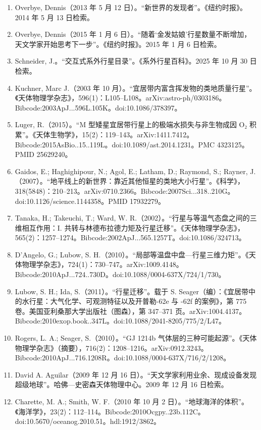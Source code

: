 \begin{enumerate}
\item Overbye, Dennis（2013 年 5 月 12 日）。“新世界的发现者”。《纽约时报》。2014 年 5 月 13 日检索。
\item Overbye, Dennis（2015 年 1 月 6 日）。“随着‘金发姑娘’行星数量不断增加，天文学家开始思考下一步”。《纽约时报》。2015 年 1 月 6 日检索。
\item Schneider, J.。“交互式系外行星目录”。《系外行星百科》。2025 年 10 月 30 日检索。
\item Kuchner, Marc J.（2003 年 10 月）。“宜居带内富含挥发物的类地质量行星”。《天体物理学杂志》，596(1)：L105–L108。arXiv:astro-ph/0303186。Bibcode:2003ApJ...596L.105K。doi:10.1086/378397。
\item Luger, R.（2015）。“M 型矮星宜居带行星上的极端水损失与非生物成因 O₂ 积累”。《天体生物学》，15(2)：119–143。arXiv:1411.7412。Bibcode:2015AsBio..15..119L。doi:10.1089/ast.2014.1231。PMC 4323125。PMID 25629240。
\item Gaidos, E.; Haghighipour, N.; Agol, E.; Latham, D.; Raymond, S.; Rayner, J.（2007）。“地平线上的新世界：靠近其他恒星的类地大小行星”。《科学》，318(5848)：210–213。arXiv:0710.2366。Bibcode:2007Sci...318..210G。doi:10.1126/science.1144358。PMID 17932279。
\item Tanaka, H.; Takeuchi, T.; Ward, W. R.（2002）。“行星与等温气态盘之间的三维相互作用：I. 共转与林德布拉德力矩及行星迁移”。《天体物理学杂志》，565(2)：1257–1274。Bibcode:2002ApJ...565.1257T。doi:10.1086/324713。
\item D'Angelo, G.; Lubow, S. H.（2010）。“局部等温盘中盘—行星三维力矩”。《天体物理学杂志》，724(1)：730–747。arXiv:1009.4148。Bibcode:2010ApJ...724..730D。doi:10.1088/0004-637X/724/1/730。
\item Lubow, S. H.; Ida, S.（2011）。“行星迁移”。载于 S. Seager（编）：《宜居带中的水行星：大气化学、可观测特征以及开普勒-62e 与 -62f 的案例》，第 775 卷。美国亚利桑那大学出版社（图森），第 347–371 页。arXiv:1004.4137。Bibcode:2010exop.book..347L。doi:10.1088/2041-8205/775/2/L47。
\item Rogers, L. A.; Seager, S.（2010）。“GJ 1214b 气体层的三种可能起源”。《天体物理学杂志》（摘要），716(2)：1208–1216。arXiv:0912.3243。Bibcode:2010ApJ...716.1208R。doi:10.1088/0004-637X/716/2/1208。
\item David A. Aguilar（2009 年 12 月 16 日）。“天文学家利用业余、现成设备发现超级地球”。哈佛—史密森天体物理中心。2009 年 12 月 16 日检索。
\item Charette, M. A.; Smith, W. F.（2010 年 10 月 2 日）。“地球海洋的体积”。《海洋学》，23(2)：112–114。Bibcode:2010Ocgpy..23b.112C。doi:10.5670/oceanog.2010.51。hdl:1912/3862。

\end{enumerate}
